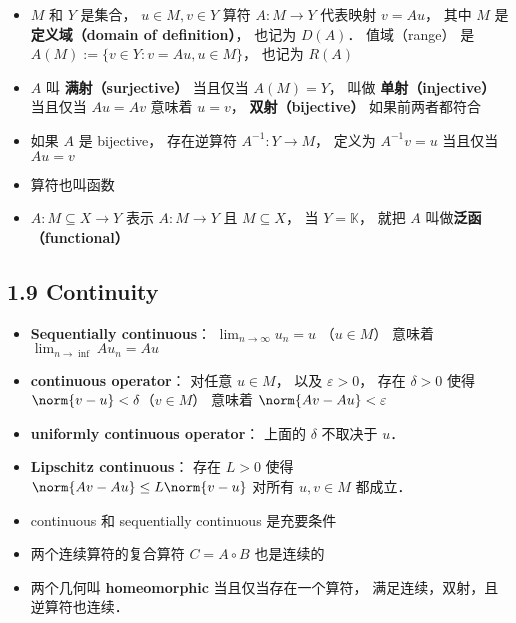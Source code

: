 \begin{itemize}
\item $M$ 和 $Y$ 是集合， $u \in M, v \in Y$ 算符 $A: M \to Y$ 代表映射 $v = Au$， 其中 $M$ 是\textbf{定义域（domain of definition）}， 也记为 $D(A)$． 值域（range） 是 $A(M) := \{v \in Y: v = Au, u \in M\}$， 也记为 $R(A)$

\item $A$ 叫 \textbf{满射（surjective）} 当且仅当 $A(M) = Y$， 叫做 \textbf{单射（injective）} 当且仅当 $Au = Av$ 意味着 $u = v$， \textbf{双射（bijective）} 如果前两者都符合

\item 如果 $A$ 是 bijective， 存在逆算符 $A^{-1}: Y \to M$， 定义为 $A^{-1} v = u$ 当且仅当 $Au = v$


\item 算符也叫函数

\item $A: M \subseteq X \to Y$ 表示 $A: M \to Y$ 且 $M \subseteq X$， 当 $Y = \mathbb K$， 就把 $A$ 叫做\textbf{泛函（functional）}
\end{itemize}

\subsection{1.9 Continuity}
\begin{itemize}
\item \textbf{Sequentially continuous}： $\lim_{n\to\infty} u_n = u$ （$u\in M$） 意味着 $\lim_{n\to\inf} Au_n = Au$

\item \textbf{continuous operator}： 对任意 $u\in M$， 以及 $\varepsilon>0$， 存在 $\delta >0$ 使得 $\norm{v-u}<\delta$（$v\in M$） 意味着 $\norm{Av-Au}<\varepsilon$

\item \textbf{uniformly continuous operator}： 上面的 $\delta$ 不取决于 $u$．

\item \textbf{Lipschitz continuous}： 存在 $L > 0$ 使得 $\norm{Av-Au} \le L\norm{v-u}$ 对所有 $u,v \in M$ 都成立．

\item continuous 和 sequentially continuous 是充要条件

\item 两个连续算符的复合算符 $C =  A \circ B$ 也是连续的

\item 两个几何叫 \textbf{homeomorphic} 当且仅当存在一个算符， 满足连续，双射，且逆算符也连续．
\end{itemize}

